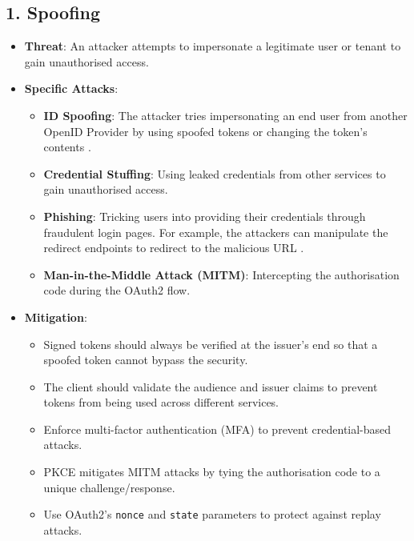 \subsection*{1. Spoofing}
\begin{itemize}
    \item \textbf{Threat}: An attacker attempts to impersonate a legitimate user or tenant to gain unauthorised access.
    \item \textbf{Specific Attacks}:
    \begin{itemize}
        \item \textbf{ID Spoofing}: The attacker tries impersonating an end user from another OpenID Provider by using spoofed tokens or changing the token's contents \citep{oidc_attacks}.
        \item \textbf{Credential Stuffing}: Using leaked credentials from other services to gain unauthorised access.
        \item \textbf{Phishing}: Tricking users into providing their credentials through fraudulent login pages. For example, the attackers can manipulate the redirect endpoints to redirect to the malicious URL \citep{open_redirect_oidc_threat}.
        \item \textbf{Man-in-the-Middle Attack (MITM)}: Intercepting the authorisation code during the OAuth2 flow.
    \end{itemize}
    \item \textbf{Mitigation}:
    \begin{itemize}
        \item Signed tokens should always be verified at the issuer's end so that a spoofed token cannot bypass the security.
        \item The client should validate the audience and issuer claims to prevent tokens from being used across different services.
        \item Enforce multi-factor authentication (MFA) to prevent credential-based attacks.
        \item PKCE mitigates MITM attacks by tying the authorisation code to a unique challenge/response.
        \item Use OAuth2’s \texttt{nonce} and \texttt{state} parameters to protect against replay attacks.
    \end{itemize}
\end{itemize}

